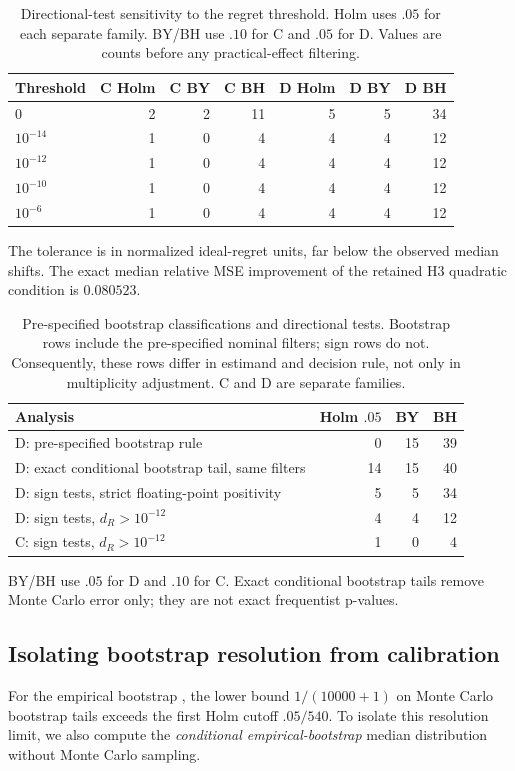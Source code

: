 \begin{table}[htbp]\centering\small
\caption{Directional-test sensitivity to the regret threshold. Holm uses $.05$ for each separate family. BY/BH use $.10$ for C and $.05$ for D. Values are counts before any practical-effect filtering.}
\begin{tabular}{lrrrrrr}\hline
Threshold & C Holm & C BY & C BH & D Holm & D BY & D BH\\\hline
$0$ & 2 & 2 & 11 & 5 & 5 & 34\\
$10^{-14}$ & 1 & 0 & 4 & 4 & 4 & 12\\
$10^{-12}$ & 1 & 0 & 4 & 4 & 4 & 12\\
$10^{-10}$ & 1 & 0 & 4 & 4 & 4 & 12\\
$10^{-6}$ & 1 & 0 & 4 & 4 & 4 & 12\\\hline
\end{tabular}
\end{table}
The tolerance is in normalized ideal-regret units, far below the observed median shifts. The exact median relative MSE improvement of the retained H3 quadratic condition is $0.080523$.

\begin{table}[htbp]
\caption{Pre-specified bootstrap classifications and directional tests. Bootstrap rows include the pre-specified nominal filters; sign rows do not. Consequently, these rows differ in estimand and decision rule, not only in multiplicity adjustment. C and D are separate families.}
\label{tab:sensitivity}\centering\small
\begin{tabular}{lrrr}\hline
Analysis & Holm $.05$ & BY & BH\\\hline
D: pre-specified bootstrap rule & 0 & 15 & 39\\
D: exact conditional bootstrap tail, same filters & 14 & 15 & 40\\
D: sign tests, strict floating-point positivity & 5 & 5 & 34\\
D: sign tests, $d_R>10^{-12}$ & 4 & 4 & 12\\
C: sign tests, $d_R>10^{-12}$ & 1 & 0 & 4\\\hline
\end{tabular}
\par\smallskip\footnotesize BY/BH use $.05$ for D and $.10$ for C. Exact conditional bootstrap tails remove Monte Carlo error only; they are not exact frequentist p-values.
\end{table}

\subsection{Isolating bootstrap resolution from calibration}\label{app:bootstrap_resolution}
For the empirical bootstrap \citep{EfronTibshirani1993}, the lower bound $1/(10000+1)$ on Monte Carlo bootstrap tails exceeds the first Holm cutoff $.05/540$. To isolate this resolution limit, we also compute the \emph{conditional empirical-bootstrap} median distribution without Monte Carlo sampling.

